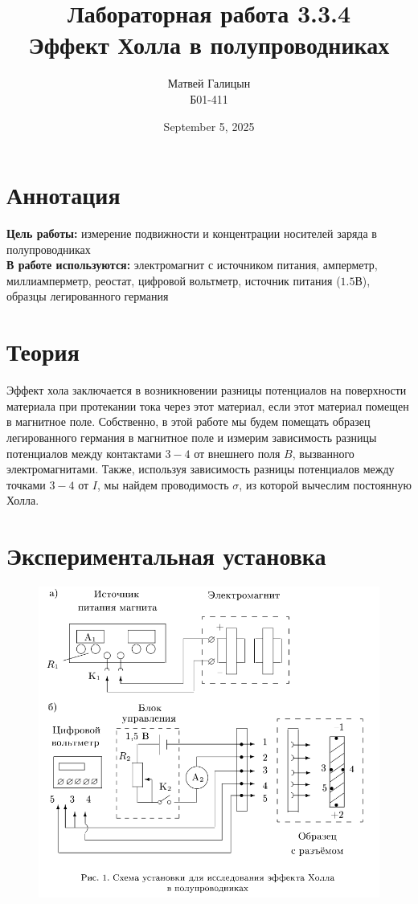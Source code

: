 \documentclass[a4paper, 10pt, twocolumn]{article}
\title{Лабораторная работа 3.3.4 \\ Эффект Холла в полупроводниках}
\author{Матвей Галицын \\ Б01-411}
\date{September 5, 2025}
\begin{document}
\maketitle
\newpage{}
\section{Аннотация}

\textbf{Цель работы:} измерение подвижности и концентрации носителей заряда в полупроводниках\\

\textbf{В работе используются:} электромагнит с источником питания, амперметр, миллиамперметр, реостат, цифровой вольтметр, источник питания ($1.5 \text{В}$), образцы легированного германия\\

\section{Теория}
    Эффект хола заключается в возникновении разницы потенциалов на поверхности материала при 
    протекании тока через этот материал, если этот материал помещен в магнитное поле. Собственно, в 
    этой работе мы будем помещать образец легированного германия в магнитное поле и измерим 
    зависимость разницы потенциалов между контактами $3-4$ от внешнего поля $B$, вызванного 
    электромагнитами. Также, используя зависимость разницы потенциалов между точками $3-4$ от $I$, 
    мы найдем проводимость $\sigma$, из которой вычеслим постоянную Холла.
\section{Экспериментальная установка}
    \begin{figure}[H]
        \includegraphics[width=1\linewidth]{images/setup.png}
    \end{figure}
    
\end{document}
